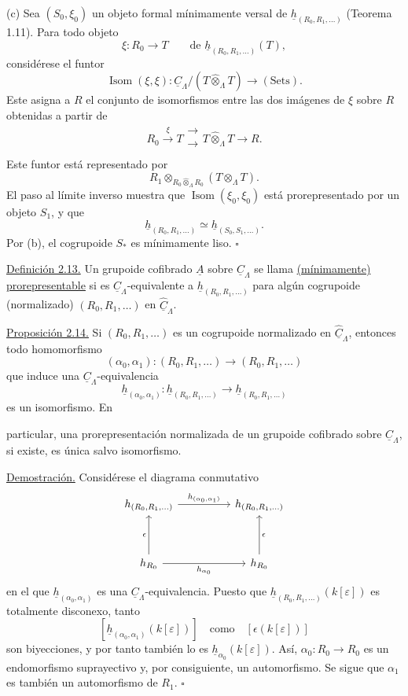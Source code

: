 \par
(c) Sea $(S_0,\xi_0)$ un objeto formal mínimamente versal de
$\underline h_{(R_0,R_1,\ldots)}$ (Teorema 1.11). Para todo objeto
\[
 \xi:R_0\longrightarrow T
 \qquad\text{de }\underline h_{(R_0,R_1,\ldots)}(T),
\]
considérese el funtor
\[
 \operatorname{Isom}(\xi,\xi):
 \underline C_\Lambda/(T\widehat\otimes_\Lambda T)
 \longrightarrow(\mathrm{Sets}).
\]
Este asigna a $R$ el conjunto de isomorfismos entre las dos imágenes de
$\xi$ sobre $R$ obtenidas a partir de
\[
 R_0\xrightarrow{\ \xi\ }T
 \mathrel{\substack{\xrightarrow{}\\[-.6ex]\xrightarrow[]{}}}
 T\widehat\otimes_\Lambda T\longrightarrow R.
\]
Este funtor está representado por
\[
 R_1\otimes_{R_0\widehat\otimes_\Lambda R_0}
       (T\otimes_\Lambda T).
\]
El paso al límite inverso muestra que
$\operatorname{Isom}(\xi_0,\xi_0)$ está prorepresentado por un objeto
$S_1$, y que
\[
 \underline h_{(R_0,R_1,\ldots)}
 \simeq\underline h_{(S_0,S_1,\ldots)}.
\]
Por (b), el cogrupoide $S_*$ es mínimamente liso. \hfill$\square$

\underline{Definición 2.13.} Un grupoide cofibrado $\underline A$
sobre $\underline C_\Lambda$ se llama \underline{(mínimamente)
prorepresentable} si es $\underline C_\Lambda$-equivalente a
$\underline h_{(R_0,R_1,\ldots)}$ para algún cogrupoide (normalizado)
$(R_0,R_1,\ldots)$ en $\widehat{\underline C}_\Lambda$.

\underline{Proposición 2.14.} Si $(R_0,R_1,\ldots)$ es un cogrupoide
normalizado en $\widehat{\underline C}_\Lambda$, entonces todo
homomorfismo
\[
 (\alpha_0,\alpha_1):(R_0,R_1,\ldots)
 \longrightarrow(R_0,R_1,\ldots)
\]
que induce una $\underline C_\Lambda$-equivalencia
\[
 \underline h_{(\alpha_0,\alpha_1)}:
 \underline h_{(R_0,R_1,\ldots)}
 \longrightarrow\underline h_{(R_0,R_1,\ldots)}
\]
es un isomorfismo. En


particular, una prorepresentación normalizada de un grupoide cofibrado
sobre $\underline C_\Lambda$, si existe, es única salvo isomorfismo.

\underline{Demostración.} Considérese el diagrama conmutativo
\[
\begin{tikzcd}[column sep=huge,row sep=huge]
 \underline h_{(R_0,R_1,\ldots)}
   \arrow[r,"{\underline h_{(\alpha_0,\alpha_1)}}"]
 & \underline h_{(R_0,R_1,\ldots)}\\
 \underline h_{R_0} \arrow[u,"\epsilon"]
   \arrow[r,"{\underline h_{\alpha_0}}"']
 & \underline h_{R_0} \arrow[u,"\epsilon"']
\end{tikzcd}
\]
en el que $\underline h_{(\alpha_0,\alpha_1)}$ es una
$\underline C_\Lambda$-equivalencia. Puesto que
$\underline h_{(R_0,R_1,\ldots)}(k[\varepsilon])$ es totalmente
disconexo, tanto
\[
 [\underline h_{(\alpha_0,\alpha_1)}(k[\varepsilon])]
 \quad\text{como}\quad
 [\epsilon(k[\varepsilon])]
\]
son biyecciones, y por tanto también lo es
$\underline h_{\alpha_0}(k[\varepsilon])$. Así,
$\alpha_0:R_0\longrightarrow R_0$ es un endomorfismo suprayectivo y,
por consiguiente, un automorfismo. Se sigue que $\alpha_1$ es también un
automorfismo de $R_1$. \hfill$\square$
